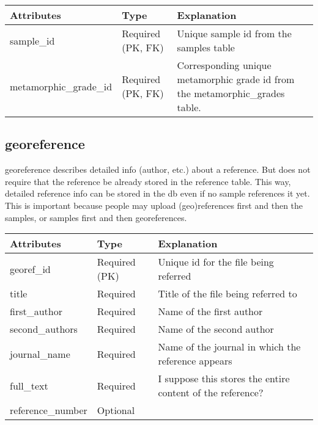 \documentclass[letterpaper,10pt,english]{sphinxmanual}
\begin{document}
\begin{tabulary}{\linewidth}{|L|L|L|}
\hline
\textbf{
Attributes
} & \textbf{
Type
} & \textbf{
Explanation
}\\\hline

sample\_id
 & 
Required (PK, FK)
 & 
Unique sample id from the samples table
\\\hline

metamorphic\_grade\_id
 & 
Required (PK, FK)
 & 
Corresponding unique metamorphic grade id from the
metamorphic\_grades table.
\\\hline
\end{tabulary}



\subsection{georeference}
\label{Table_Description:georeference}
georeference describes detailed info (author, etc.) about a reference. But does not require that the reference be already stored in the reference table.  This way, detailed reference info can be stored in the db even if no sample references it yet.
This is important because people may upload (geo)references first and then the samples, or samples first and then georeferences.

\begin{tabulary}{\linewidth}{|L|L|L|}
\hline
\textbf{
Attributes
} & \textbf{
Type
} & \textbf{
Explanation
}\\\hline

georef\_id
 & 
Required (PK)
 & 
Unique id for the file being referred
\\\hline

title
 & 
Required
 & 
Title of the file being referred to
\\\hline

first\_author
 & 
Required
 & 
Name of the first author
\\\hline

second\_authors
 & 
Required
 & 
Name of the second author
\\\hline

journal\_name
 & 
Required
 & 
Name of the journal in which the reference appears
\\\hline

full\_text
 & 
Required
 & 
I suppose this stores the entire content of the reference?
\\\hline

reference\_number
 & 
Optional
 & \\\hline
\end{tabulary}
\end{document}

